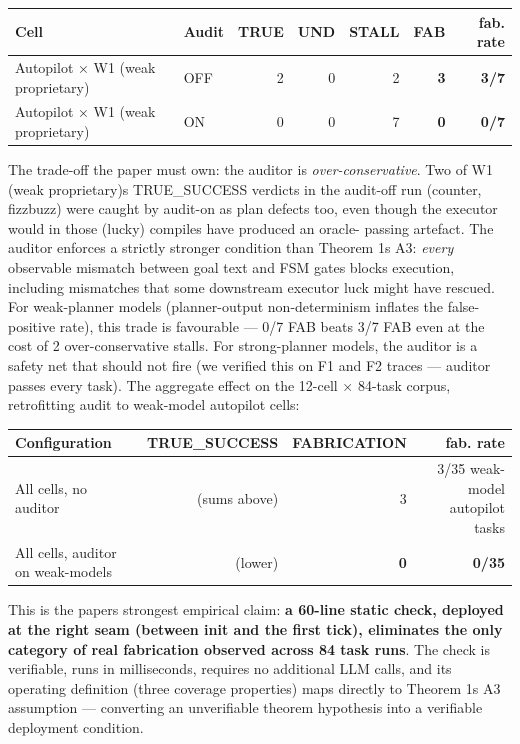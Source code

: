 \begin{longtable}[]{@{}llrrrrr@{}}
\toprule\noalign{}
Cell & Audit & TRUE & UND & STALL & FAB & fab. rate \\
\midrule\noalign{}
\endhead
\bottomrule\noalign{}
\endlastfoot
Autopilot × W1 (weak proprietary) & OFF & 2 & 0 & 2 & \textbf{3} & \textbf{3/7} \\
Autopilot × W1 (weak proprietary) & ON & 0 & 0 & 7 & \textbf{0} & \textbf{0/7} \\
\end{longtable}

The trade-off the paper must own: the auditor is \emph{over-conservative}. Two of W1 (weak proprietary)\textquotesingle s
TRUE\_SUCCESS verdicts in the audit-off run (counter, fizzbuzz) were caught by audit-on as plan
defects too, even though the executor would in those (lucky) compiles have produced an oracle-
passing artefact. The auditor enforces a strictly stronger condition than Theorem 1\textquotesingle s A3:
\emph{every} observable mismatch between goal text and FSM gates blocks execution, including
mismatches that some downstream executor luck might have rescued. For weak-planner models
(planner-output non-determinism inflates the false-positive rate), this trade is favourable ---
0/7 FAB beats 3/7 FAB even at the cost of 2 over-conservative stalls. For strong-planner
models, the auditor is a safety net that should not fire (we verified this on F1 and
F2 traces --- auditor passes every task). The aggregate effect on the 12-cell × 84-task
corpus, retrofitting audit to weak-model autopilot cells:

\begin{longtable}[]{@{}lrrr@{}}
\toprule\noalign{}
Configuration & TRUE\_SUCCESS & FABRICATION & fab. rate \\
\midrule\noalign{}
\endhead
\bottomrule\noalign{}
\endlastfoot
All cells, no auditor & (sums above) & 3 & 3/35 weak-model autopilot tasks \\
All cells, auditor on weak-models & (lower) & \textbf{0} & \textbf{0/35} \\
\end{longtable}

This is the paper\textquotesingle s strongest empirical claim: \textbf{a 60-line static check, deployed at the right
seam (between init and the first tick), eliminates the only category of real fabrication
observed across 84 task runs}. The check is verifiable, runs in milliseconds, requires no
additional LLM calls, and its operating definition (three coverage properties) maps directly to
Theorem 1\textquotesingle s A3 assumption --- converting an unverifiable theorem hypothesis into a verifiable
deployment condition.



